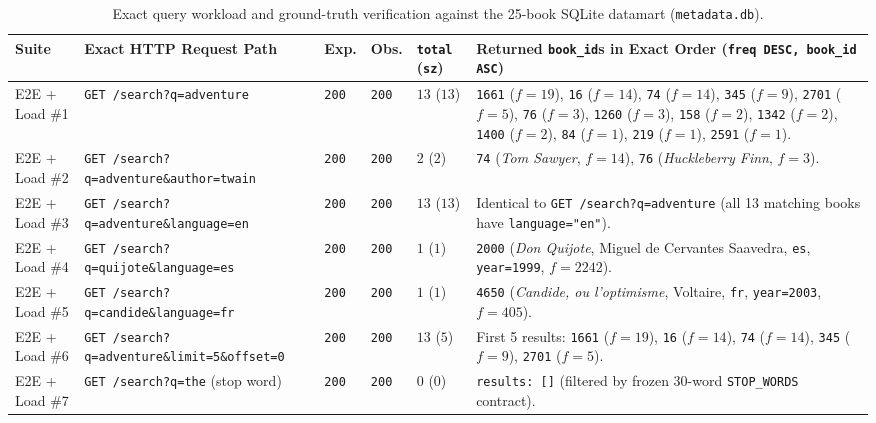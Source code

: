 \documentclass[10pt,a4paper]{article}
\begin{document}
\begin{table}[!htbp]
\centering
\caption{Exact query workload and ground-truth verification against the 25-book SQLite datamart (\texttt{metadata.db}).}
\label{tab:query_ground_truth}
\scriptsize
\setlength{\tabcolsep}{3.5pt}
\renewcommand{\arraystretch}{1.18}
\begin{tabularx}{\textwidth}{L{2.0cm} L{4.6cm} C{0.8cm} C{0.8cm} C{1.3cm} Y}
\toprule
\textbf{Suite} & \textbf{Exact HTTP Request Path} & \textbf{Exp.} & \textbf{Obs.} & \textbf{\texttt{total} (\texttt{sz})} & \textbf{Returned \texttt{book\_id}s in Exact Order (\texttt{freq DESC, book\_id ASC})} \\
\midrule
E2E + Load \#1 & \texttt{GET /search?q=adventure} & \texttt{200} & \texttt{200} & $13$ ($13$) & \texttt{1661} ($f{=}19$), \texttt{16} ($f{=}14$), \texttt{74} ($f{=}14$), \texttt{345} ($f{=}9$), \texttt{2701} ($f{=}5$), \texttt{76} ($f{=}3$), \texttt{1260} ($f{=}3$), \texttt{158} ($f{=}2$), \texttt{1342} ($f{=}2$), \texttt{1400} ($f{=}2$), \texttt{84} ($f{=}1$), \texttt{219} ($f{=}1$), \texttt{2591} ($f{=}1$). \\
E2E + Load \#2 & \texttt{GET /search?q=adventure\&author=twain} & \texttt{200} & \texttt{200} & $2$ ($2$) & \texttt{74} (\emph{Tom Sawyer}, $f{=}14$), \texttt{76} (\emph{Huckleberry Finn}, $f{=}3$). \\
E2E + Load \#3 & \texttt{GET /search?q=adventure\&language=en} & \texttt{200} & \texttt{200} & $13$ ($13$) & Identical to \texttt{GET /search?q=adventure} (all 13 matching books have \texttt{language="en"}). \\
E2E + Load \#4 & \texttt{GET /search?q=quijote\&language=es} & \texttt{200} & \texttt{200} & $1$ ($1$) & \texttt{2000} (\emph{Don Quijote}, Miguel de Cervantes Saavedra, \texttt{es}, \texttt{year=1999}, $f{=}2242$). \\
E2E + Load \#5 & \texttt{GET /search?q=candide\&language=fr} & \texttt{200} & \texttt{200} & $1$ ($1$) & \texttt{4650} (\emph{Candide, ou l'optimisme}, Voltaire, \texttt{fr}, \texttt{year=2003}, $f{=}405$). \\
E2E + Load \#6 & \texttt{GET /search?q=adventure\&limit=5\&offset=0} & \texttt{200} & \texttt{200} & $13$ ($5$) & First 5 results: \texttt{1661} ($f{=}19$), \texttt{16} ($f{=}14$), \texttt{74} ($f{=}14$), \texttt{345} ($f{=}9$), \texttt{2701} ($f{=}5$). \\
E2E + Load \#7 & \texttt{GET /search?q=the} (stop word) & \texttt{200} & \texttt{200} & $0$ ($0$) & \texttt{results: []} (filtered by frozen 30-word \texttt{STOP\_WORDS} contract). \\

\end{tabularx}
\end{table}
\end{document}
